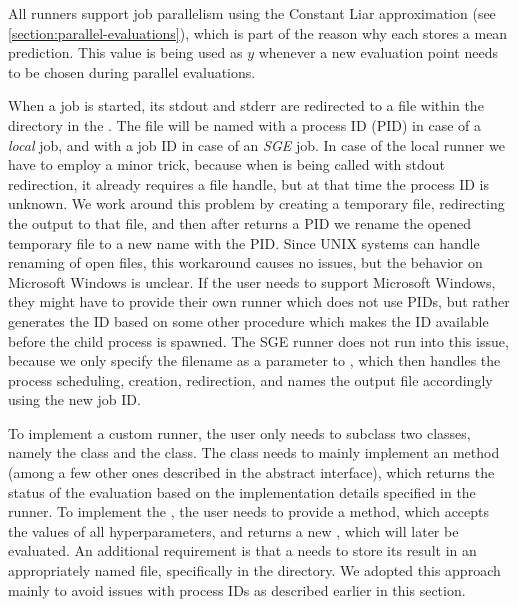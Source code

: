 All runners support job parallelism using the Constant Liar approximation (see \autoref{section:parallel-evaluations}), which is part of the reason why each  stores a mean prediction. This value is being used as $y$ whenever a new evaluation point needs to be chosen during parallel evaluations.

When a job is started, its stdout and stderr are redirected to a file within the  directory in the . The file will be named with a process ID (PID) in case of a \emph{local} job, and with a job ID in case of an \emph{SGE} job. In case of the local runner we have to employ a minor trick, because when  is being called with stdout redirection, it already requires a file handle, but at that time the process ID is unknown. We work around this problem by creating a temporary file, redirecting the output to that file, and then after  returns a PID we rename the opened temporary file to a new name with the PID. Since UNIX systems can handle renaming of open files, this workaround causes no issues, but the behavior on Microsoft Windows is unclear. If the user needs to support Microsoft Windows, they might have to provide their own runner which does not use PIDs, but rather generates the ID based on some other procedure which makes the ID available before the child process is spawned. The SGE runner does not run into this issue, because we only specify the filename as a parameter to , which then handles the process scheduling, creation, redirection, and names the output file accordingly using the new job ID.

To implement a custom runner, the user only needs to subclass two classes, namely the  class and the  class. The  class needs to mainly implement an  method (among a few other ones described in the abstract interface), which returns the status of the evaluation based on the implementation details specified in the runner. To implement the , the user needs to provide a  method, which accepts the values of all hyperparameters, and returns a new , which will later be evaluated. An additional requirement is that a  needs to store its result in an appropriately named file, specifically  in the  directory. We adopted this approach mainly to avoid issues with process IDs as described earlier in this section.

